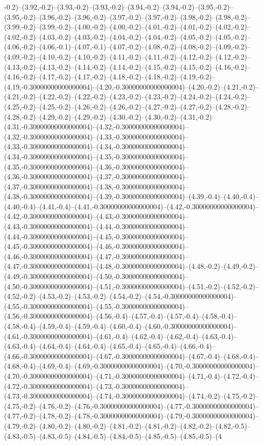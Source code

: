 -0.2)--(3.92,-0.2)--(3.93,-0.2)--(3.93,-0.2)--(3.94,-0.2)--(3.94,-0.2)--(3.95,-0.2)--(3.95,-0.2)--(3.96,-0.2)--(3.96,-0.2)--(3.97,-0.2)--(3.97,-0.2)--(3.98,-0.2)--(3.98,-0.2)--(3.99,-0.2)--(3.99,-0.2)--(4.00,-0.2)--(4.00,-0.2)--(4.01,-0.2)--(4.01,-0.2)--(4.02,-0.2)--(4.02,-0.2)--(4.03,-0.2)--(4.03,-0.2)--(4.04,-0.2)--(4.04,-0.2)--(4.05,-0.2)--(4.05,-0.2)--(4.06,-0.2)--(4.06,-0.1)--(4.07,-0.1)--(4.07,-0.2)--(4.08,-0.2)--(4.08,-0.2)--(4.09,-0.2)--(4.09,-0.2)--(4.10,-0.2)--(4.10,-0.2)--(4.11,-0.2)--(4.11,-0.2)--(4.12,-0.2)--(4.12,-0.2)--(4.13,-0.2)--(4.13,-0.2)--(4.14,-0.2)--(4.14,-0.2)--(4.15,-0.2)--(4.15,-0.2)--(4.16,-0.2)--(4.16,-0.2)--(4.17,-0.2)--(4.17,-0.2)--(4.18,-0.2)--(4.18,-0.2)--(4.19,-0.2)--(4.19,-0.30000000000000004)--(4.20,-0.30000000000000004)--(4.20,-0.2)--(4.21,-0.2)--(4.21,-0.2)--(4.22,-0.2)--(4.22,-0.2)--(4.23,-0.2)--(4.23,-0.2)--(4.24,-0.2)--(4.24,-0.2)--(4.25,-0.2)--(4.25,-0.2)--(4.26,-0.2)--(4.26,-0.2)--(4.27,-0.2)--(4.27,-0.2)--(4.28,-0.2)--(4.28,-0.2)--(4.29,-0.2)--(4.29,-0.2)--(4.30,-0.2)--(4.30,-0.2)--(4.31,-0.2)--(4.31,-0.30000000000000004)--(4.32,-0.30000000000000004)--(4.32,-0.30000000000000004)--(4.33,-0.30000000000000004)--(4.33,-0.30000000000000004)--(4.34,-0.30000000000000004)--(4.34,-0.30000000000000004)--(4.35,-0.30000000000000004)--(4.35,-0.30000000000000004)--(4.36,-0.30000000000000004)--(4.36,-0.30000000000000004)--(4.37,-0.30000000000000004)--(4.37,-0.30000000000000004)--(4.38,-0.30000000000000004)--(4.38,-0.30000000000000004)--(4.39,-0.30000000000000004)--(4.39,-0.4)--(4.40,-0.4)--(4.40,-0.4)--(4.41,-0.4)--(4.41,-0.30000000000000004)--(4.42,-0.30000000000000004)--(4.42,-0.30000000000000004)--(4.43,-0.30000000000000004)--(4.43,-0.30000000000000004)--(4.44,-0.30000000000000004)--(4.44,-0.30000000000000004)--(4.45,-0.30000000000000004)--(4.45,-0.30000000000000004)--(4.46,-0.30000000000000004)--(4.46,-0.30000000000000004)--(4.47,-0.30000000000000004)--(4.47,-0.30000000000000004)--(4.48,-0.30000000000000004)--(4.48,-0.2)--(4.49,-0.2)--(4.49,-0.30000000000000004)--(4.50,-0.30000000000000004)--(4.50,-0.30000000000000004)--(4.51,-0.30000000000000004)--(4.51,-0.2)--(4.52,-0.2)--(4.52,-0.2)--(4.53,-0.2)--(4.53,-0.2)--(4.54,-0.2)--(4.54,-0.30000000000000004)--(4.55,-0.30000000000000004)--(4.55,-0.30000000000000004)--(4.56,-0.30000000000000004)--(4.56,-0.4)--(4.57,-0.4)--(4.57,-0.4)--(4.58,-0.4)--(4.58,-0.4)--(4.59,-0.4)--(4.59,-0.4)--(4.60,-0.4)--(4.60,-0.30000000000000004)--(4.61,-0.30000000000000004)--(4.61,-0.4)--(4.62,-0.4)--(4.62,-0.4)--(4.63,-0.4)--(4.63,-0.4)--(4.64,-0.4)--(4.64,-0.4)--(4.65,-0.4)--(4.65,-0.4)--(4.66,-0.4)--(4.66,-0.30000000000000004)--(4.67,-0.30000000000000004)--(4.67,-0.4)--(4.68,-0.4)--(4.68,-0.4)--(4.69,-0.4)--(4.69,-0.30000000000000004)--(4.70,-0.30000000000000004)--(4.70,-0.30000000000000004)--(4.71,-0.30000000000000004)--(4.71,-0.4)--(4.72,-0.4)--(4.72,-0.30000000000000004)--(4.73,-0.30000000000000004)--(4.73,-0.30000000000000004)--(4.74,-0.30000000000000004)--(4.74,-0.2)--(4.75,-0.2)--(4.75,-0.2)--(4.76,-0.2)--(4.76,-0.30000000000000004)--(4.77,-0.30000000000000004)--(4.77,-0.2)--(4.78,-0.2)--(4.78,-0.30000000000000004)--(4.79,-0.30000000000000004)--(4.79,-0.2)--(4.80,-0.2)--(4.80,-0.2)--(4.81,-0.2)--(4.81,-0.2)--(4.82,-0.2)--(4.82,-0.5)--(4.83,-0.5)--(4.83,-0.5)--(4.84,-0.5)--(4.84,-0.5)--(4.85,-0.5)--(4.85,-0.5)--(4